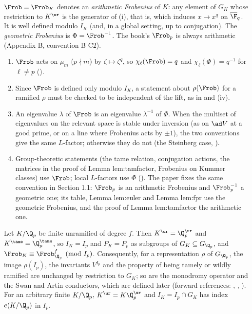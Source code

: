 \begin{convention}[Frobenius]\label{conv:local:frobenius}
$\Frob=\Frob_K$ denotes an \emph{arithmetic Frobenius} of $K$: any element of $G_K$ whose restriction to $K^{\ur}$ is the generator of
(i), that is, which induces $x\mapsto x^q$ on $\overline\F_q$. It is well defined modulo $I_K$ (and, in a global setting, up to
conjugation). The \emph{geometric Frobenius} is $\Phi=\Frob^{-1}$. The book's $\Frob_p$ is always arithmetic (Appendix B, convention B-C2).
\begin{enumerate}[label=(\alph*)]
\item $\Frob$ acts on $\mu_m$ ($p\nmid m$) by $\zeta\mapsto\zeta^q$, so $\chi_\ell(\Frob)=q$ and $\chi_\ell(\Phi)=q^{-1}$ for $\ell\ne p$
().
\item Since $\Frob$ is defined only modulo $I_K$, a statement about $\rho(\Frob)$ for a ramified $\rho$ must be checked to be independent of the
lift, as in  and (iv).
\item An eigenvalue $\lambda$ of $\Frob$ is an eigenvalue $\lambda^{-1}$ of $\Phi$. When the multiset of eigenvalues on the relevant space is stable
under inversion (as on $\ad V$ at a good prime, or on a line where Frobenius acts by $\pm1$), the two conventions give the same $L$-factor;
otherwise they do not (the Steinberg case, ).
\item Group-theoretic statements (the tame relation, conjugation actions, the matrices in the proof of Lemma lem:tamfactor, Frobenius on Kummer
classes) use $\Frob$; local $L$-factors use $\Phi$ (). The paper fixes the same convention in Section 1.1: $\Frob_p$ is an arithmetic Frobenius and $\Frob_p^{-1}$ a geometric one; its table, Lemma lem:euler and Lemma lem:fpr use
the geometric Frobenius, and the proof of Lemma lem:tamfactor the arithmetic one.
\end{enumerate}
\end{convention}

\begin{proposition}\label{prop:local:unram-basechange}
Let $K/\Q_p$ be finite unramified of degree $f$. Then $K^{\ur}=\Q_p^{\ur}$ and $K^{\tame}=\Q_p^{\tame}$, so $I_K=I_p$ and $P_K=P_p$ as subgroups of
$G_K\subseteq G_{\Q_p}$, and $\Frob_K\equiv\Frob_{\Q_p}^f\pmod{I_p}$. Consequently, for a representation $\rho$ of $G_{\Q_p}$, the image $\rho(I_p)$, the
invariants $V^{I_p}$ and the property of being tamely or wildly ramified are unchanged by restriction to $G_K$; so are the monodromy operator and the
Swan and Artin conductors, which are defined later (forward references: , , ).
For an arbitrary finite $K/\Q_p$, $K^{\ur}=K\Q_p^{\ur}$ and $I_K=I_p\cap G_K$ has index $e(K/\Q_p)$ in $I_p$.
\end{proposition}

